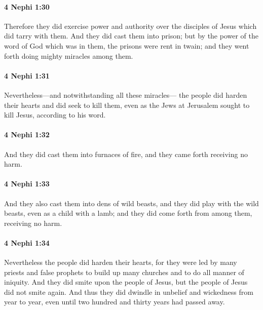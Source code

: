 		\paragraph{4 Nephi 1:30} %
			\label{4NEPHI-1-30}

			Therefore they did exercise power and authority
			over the disciples of Jesus which did tarry with them.
			And they did cast them into prison;
			but by the power of the word of God which was in them,
			the prisons were rent in twain;
			and they went forth doing mighty miracles among them.

		\paragraph{4 Nephi 1:31} %
			\label{4NEPHI-1-31}

			Nevertheless—and notwithstanding all these miracles—
			the people did harden their hearts
			and did seek to kill them,
			even as the Jews at Jerusalem sought to kill Jesus,
			according to his word.

		\paragraph{4 Nephi 1:32} %
			\label{4NEPHI-1-32}

			And they did cast them into furnaces of fire,
			and they came forth receiving no harm.

		\paragraph{4 Nephi 1:33} %
			\label{4NEPHI-1-33}

			And they also cast them into dens of wild beasts,
			and they did play with the wild beasts, even as a child with a lamb;
			and they did come forth from among them, receiving no harm.

		\paragraph{4 Nephi 1:34} %
			\label{4NEPHI-1-34}

			Nevertheless the people did harden their hearts,
			for they were led by many priests and false prophets
			to build up many churches and to do all manner of iniquity.
			And they did smite upon the people of Jesus,
			but the people of Jesus did not smite again.
			And thus they did dwindle in unbelief and wickedness from year to year,
			even until two hundred and thirty years had passed away.

